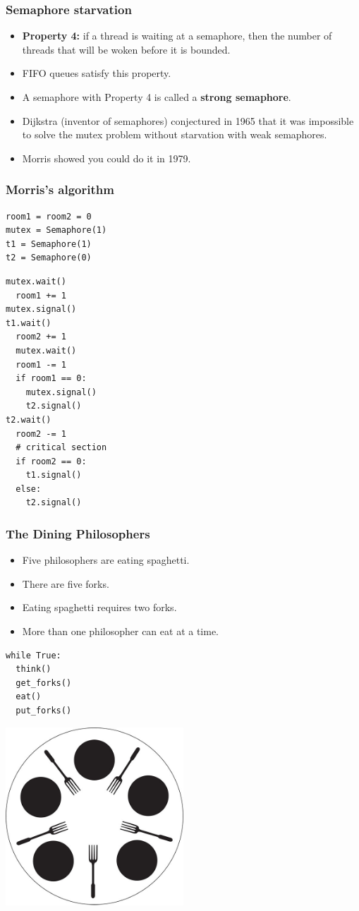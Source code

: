 \documentclass{beamer}
\newcommand{\bi}{\begin{itemize}}
\newcommand{\ii}{\item}
\newcommand{\ei}{\end{itemize}}
\newcommand{\bfr}[1]{\begin{frame}[fragile]\frametitle{{ #1 }}}
\begin{document}
\bfr{Semaphore starvation}
\bi
\ii {\bf Property 4:}  if a thread is waiting at a semaphore, then the
number of threads that will be woken before it is bounded.
\pause
\ii FIFO queues satisfy this property.
\pause
\ii A semaphore with Property 4 is called a {\bf strong semaphore}.
\pause
\ii Dijkstra (inventor of semaphores) conjectured in 1965 that it was
impossible to solve the mutex problem without starvation with weak
semaphores. 
\pause
\ii Morris showed you could do it in 1979.
\ei
\end{frame}
\bfr{Morris's algorithm}
\begin{multicols}{2}
\begin{Verbatim}[label=Initialization]
room1 = room2 = 0
mutex = Semaphore(1)
t1 = Semaphore(1)
t2 = Semaphore(0)
\end{Verbatim}
\columnbreak
\begin{Verbatim}
mutex.wait()
  room1 += 1
mutex.signal()
t1.wait()
  room2 += 1
  mutex.wait()
  room1 -= 1
  if room1 == 0:
    mutex.signal()
    t2.signal()
t2.wait()
  room2 -= 1
  # critical section
  if room2 == 0:
    t1.signal()
  else:
    t2.signal()
\end{Verbatim}
\end{multicols}
\end{frame}

\bfr{The Dining Philosophers}
\begin{multicols}{2}
  \bi
  \ii Five philosophers are eating spaghetti.
  \ii There are five forks.
  \ii Eating spaghetti requires two forks.
  \ii More than one philosopher can eat at a time.
  \ei
\mbox{}
\begin{Verbatim}[label=Philosopher i]
while True:
  think()
  get_forks()
  eat()
  put_forks()
\end{Verbatim}    
  \columnbreak
  \includegraphics[width=0.5\textwidth]{dining-philosophers.jpg}
\end{multicols}
\end{frame}
\end{document}
